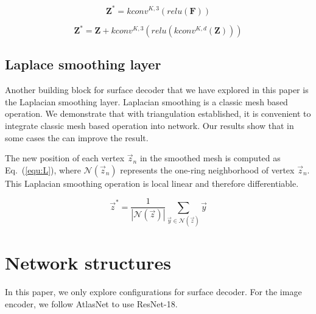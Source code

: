 \begin{equation}
\label{equ:P}
\mathbf{Z^*} = kconv^{K,3}(relu(\mathbf{F}))
\end{equation}

\begin{equation}
\label{equ:R}
\mathbf{Z^*} = \mathbf{Z} + kconv^{K,3}(relu(kconv^{K,d}(\mathbf{Z})))
\end{equation}

\subsection{Laplace smoothing layer}
Another building block for surface decoder that we have explored in this paper is the Laplacian smoothing layer. Laplacian smoothing is a classic mesh based operation. We demonstrate that with triangulation established, it is convenient to integrate classic mesh based operation into network. Our results show that in some cases the can improve the result.

The new position of each vertex $\vec{z}_n$ in the smoothed mesh is computed as Eq.~(\ref{equ:L}), where $\mathcal{N}(\vec{z}_n)$ represents the one-ring neighborhood of vertex $\vec{z}_n$. 
This Laplacian smoothing operation is local linear and therefore differentiable.

\begin{equation}
	\label{equ:L}
	\vec{z}^* = \frac{1}{|\mathcal{N}(\vec{z})|}\sum_{\vec{y}\in\mathcal{N}(\vec{z})}\vec{y}
\end{equation}

\section{Network structures}
In this paper, we only explore configurations for surface decoder. For the image encoder, we follow AtlasNet\cite{atlasnet} to use ResNet-18\cite{resnet}.

